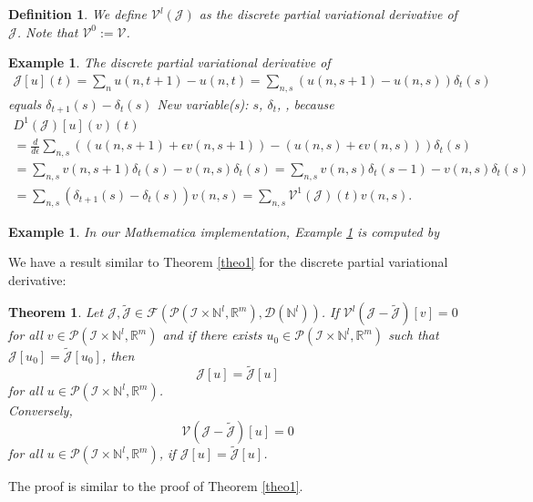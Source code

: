 \documentclass[sigconf,twocolumn]{acmart}
\newcommand{\1}{{\chi}}
\numberwithin{equation}{section}
\theoremstyle{thmlemcorr}
\numberwithin{theorem}{section}
\theoremstyle{thmlemcorr*}
\theoremstyle{defi}
\newtheorem{definition}[theorem]{Definition}
\theoremstyle{remexample}
\newtheorem{example}[theorem]{Example}
\newtheorem{teo}[theorem]{Theorem}
\theoremstyle{ass}
\begin{document}
	\normalsize
	\begin{definition}
	We define \(\mathcal{V}^l(\mathcal{J})\) as the discrete partial variational derivative of \(\mathcal{J}\).
	Note that \(\mathcal{V}^0:=\mathcal{V}\).
\end{definition}
\begin{example}
	\label{dpvd1}
	The discrete partial variational derivative of 
	\begin{gather*}
		\mathcal{J}[u](t)=\sum_nu(n,t+1)-u(n,t)=\sum_{n,s}(u(n,s+1)-u(n,s))\delta_t(s)
	\end{gather*}
	equals \(\delta_{t+1}(s)-\delta_t(s)\)
{\color{blue} New variable(s): \(s\), \(\delta _t\),  }
, because
	\small
	\begin{gather*}
		D^1(\mathcal{J})[u](v)(t)\\
		=\frac{d}{d\epsilon} \sum_{n,s}((u(n,s+1)+\epsilon v(n,s+1))-(u(n,s)+\epsilon v(n,s)))\delta_t(s)\\
		=\sum_{n,s}v(n,s+1)\delta_t(s)-v(n,s)\delta_t(s)=\sum_{n,s}v(n,s)\delta_t(s-1)-v(n,s)\delta_t(s)\\
		=\sum_{n,s}(\delta_{t+1}(s)-\delta_t(s))v(n,s)=\sum_{n,s}\mathcal{V}^1(\mathcal{J})(t)v(n,s).
	\end{gather*}
	\normalsize
\end{example}
\begin{example}
	In our {\sc Mathematica} implementation, Example \ref{dpvd1} is computed by
		
	\begin{small}
		
		
	\end{small}
\end{example}
We have a result similar to Theorem \ref{theo1} for the discrete partial variational derivative:
\begin{teo}\label{theo2}
	Let \(\mathcal{J},\tilde{\mathcal{J}}\in \mathcal{F}(\mathcal{P}({\mathcal{I}}\times{\mathbb{N}}^l,{\mathbb{R}}^m),\mathcal{D}({\mathbb{N}}^l))\). If \(\mathcal{V}^l(\mathcal{J}-\tilde{\mathcal{J}})[v]=0\) for all \(v\in\mathcal{P}({\mathcal{I}}\times{\mathbb{N}}^l,{\mathbb{R}}^m)\) and if there exists \(u_0\in\mathcal{P}({\mathcal{I}}\times{\mathbb{N}}^l,{\mathbb{R}}^m)\) such that \(\mathcal{J}[u_0]=\tilde{\mathcal{J}}[u_0]\), then
	\begin{equation*}
		\mathcal{J}[u]=\tilde{\mathcal{J}}[u]
	\end{equation*}
	for all \(u\in\mathcal{P}({\mathcal{I}}\times{\mathbb{N}}^l,{\mathbb{R}}^m)\).\\
	Conversely,
	\begin{equation*}
		\mathcal{V}(\mathcal{J}-\tilde{\mathcal{J}})[u]=0
	\end{equation*}
	for all \(u\in\mathcal{P}({\mathcal{I}}\times{\mathbb{N}}^l,{\mathbb{R}}^m)\), if \(\mathcal{J}[u]=\tilde{\mathcal{J}}[u]\).
\end{teo}
The proof is similar to the proof of Theorem \ref{theo1}.
\end{document}
